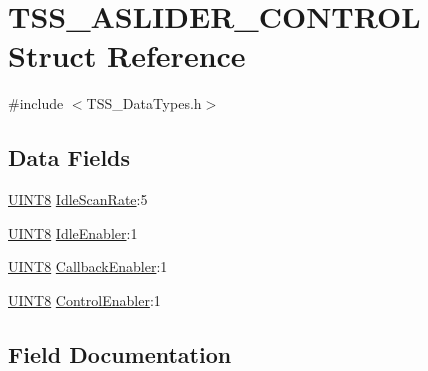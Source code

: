 \hypertarget{struct_t_s_s___a_s_l_i_d_e_r___c_o_n_t_r_o_l}{}\section{T\+S\+S\+\_\+\+A\+S\+L\+I\+D\+E\+R\+\_\+\+C\+O\+N\+T\+R\+OL Struct Reference}
\label{struct_t_s_s___a_s_l_i_d_e_r___c_o_n_t_r_o_l}


{\ttfamily \#include $<$T\+S\+S\+\_\+\+Data\+Types.\+h$>$}

\subsection*{Data Fields}
\begin{DoxyCompactItemize}
\item 
\hyperlink{_t_s_s___data_types_8h_ab27e9918b538ce9d8ca692479b375b6a}{U\+I\+N\+T8} \hyperlink{struct_t_s_s___a_s_l_i_d_e_r___c_o_n_t_r_o_l_a99c7b7e52704391b686df20f28596c3d}{Idle\+Scan\+Rate}\+:5
\item 
\hyperlink{_t_s_s___data_types_8h_ab27e9918b538ce9d8ca692479b375b6a}{U\+I\+N\+T8} \hyperlink{struct_t_s_s___a_s_l_i_d_e_r___c_o_n_t_r_o_l_aa5bc869699904b94a79c7e91a79e82f4}{Idle\+Enabler}\+:1
\item 
\hyperlink{_t_s_s___data_types_8h_ab27e9918b538ce9d8ca692479b375b6a}{U\+I\+N\+T8} \hyperlink{struct_t_s_s___a_s_l_i_d_e_r___c_o_n_t_r_o_l_a88735799df711ea15d1e1fefc41a8e89}{Callback\+Enabler}\+:1
\item 
\hyperlink{_t_s_s___data_types_8h_ab27e9918b538ce9d8ca692479b375b6a}{U\+I\+N\+T8} \hyperlink{struct_t_s_s___a_s_l_i_d_e_r___c_o_n_t_r_o_l_af8b1f79b81dd202b28e3ff059c5be194}{Control\+Enabler}\+:1
\end{DoxyCompactItemize}


\subsection{Field Documentation}
\mbox{\label{struct_t_s_s___a_s_l_i_d_e_r___c_o_n_t_r_o_l_a88735799df711ea15d1e1fefc41a8e89}} 

